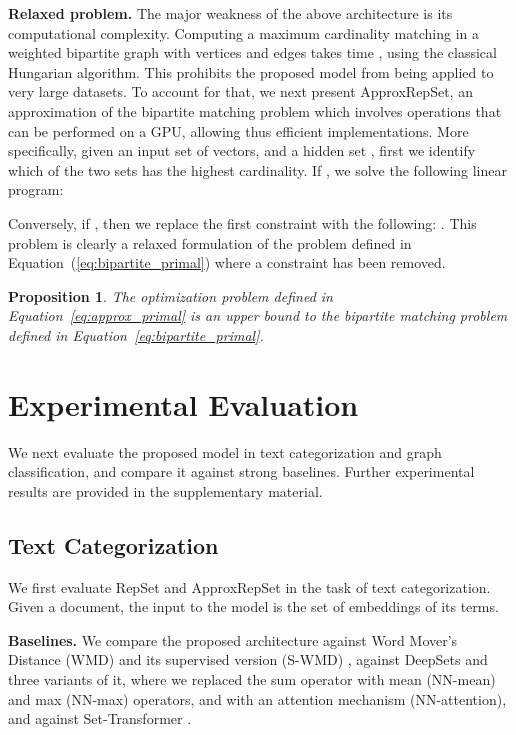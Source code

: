 \documentclass[twoside]{article}
\newtheorem{proposition}{Proposition}
\begin{document}
\noindent\textbf{Relaxed problem.}
The major weakness of the above architecture is its computational complexity.
Computing a maximum cardinality matching in a weighted bipartite graph with  vertices and  edges takes time , using the classical Hungarian algorithm.
This prohibits the proposed model from being applied to very large datasets.
To account for that, we next present ApproxRepSet, an approximation of the bipartite matching problem which involves operations that can be performed on a GPU, allowing thus efficient implementations.
More specifically, given an input set of vectors,  and a hidden set , first we identify which of the two sets has the highest cardinality.
If , we solve the following linear program:


Conversely, if , then we replace the first constraint with the following: .
This problem is clearly a relaxed formulation of the problem defined in Equation~(\ref{eq:bipartite_primal}) where a constraint has been removed.
\begin{proposition}
    The optimization problem defined in Equation~\ref{eq:approx_primal} is an upper bound to the bipartite matching problem defined in Equation~\ref{eq:bipartite_primal}.
\end{proposition}

\section{Experimental Evaluation}\label{sec:experiments}
We next evaluate the proposed model in text categorization and graph classification, and compare it against strong baselines.
Further experimental results are provided in the supplementary material.

\subsection{Text Categorization}
We first evaluate RepSet and ApproxRepSet in the task of text categorization.
Given a document, the input to the model is the set of embeddings of its terms.

\noindent\textbf{Baselines.}
We compare the proposed architecture against Word Mover's Distance (WMD) \citep{kusner2015word} and its supervised version (S-WMD) \citep{huang2016supervised}, against DeepSets \citep{zaheer2017deep} and three variants of it, where we replaced the sum operator with mean (NN-mean) and max (NN-max) operators, and with an attention mechanism (NN-attention), and against Set-Transformer \citep{lee2019set}.
\end{document}
